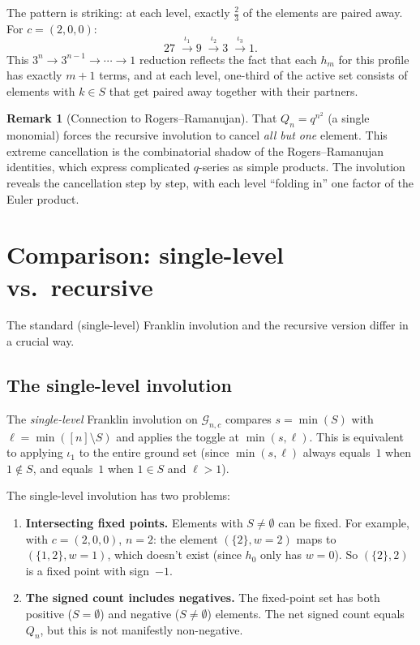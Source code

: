 \documentclass[11pt]{article}
\theoremstyle{plain}
\theoremstyle{definition}
\newtheorem{remark}[theorem]{Remark}
\begin{document}
The pattern is striking: at each level, exactly
$\frac{2}{3}$ of the elements are paired away.  For
$c = (2,0,0)$:
\[
  27 \;\xrightarrow{\;\iota_1\;}
  9 \;\xrightarrow{\;\iota_2\;}
  3 \;\xrightarrow{\;\iota_3\;}
  1.
\]
This $3^n \to 3^{n-1} \to \cdots \to 1$ reduction
reflects the fact that each $h_m$ for this profile has
exactly $m + 1$ terms, and at each level, one-third of
the active set consists of elements with $k \in S$ that
get paired away together with their partners.

\begin{remark}[Connection to Rogers--Ramanujan]
\label{rem:RR}
That $Q_n = q^{n^2}$ (a single monomial) forces the
recursive involution to cancel \emph{all but one}
element.  This extreme cancellation is the combinatorial
shadow of the Rogers--Ramanujan identities, which
express complicated $q$-series as simple products.
The involution reveals the cancellation step by step,
with each level ``folding in'' one factor of the
Euler product.
\end{remark}


\section{Comparison: single-level vs.\ recursive}
\label{sec:single-vs-recursive}

The standard (single-level) Franklin involution and the
recursive version differ in a crucial way.


\subsection{The single-level involution}

The \emph{single-level} Franklin involution on
$\mathcal{G}_{n,c}$ compares $s = \min(S)$ with
$\ell = \min([n] \setminus S)$ and applies the toggle at
$\min(s, \ell)$.  This is equivalent to applying $\iota_1$
to the entire ground set (since $\min(s, \ell)$ always
equals~$1$ when $1 \notin S$, and equals~$1$ when
$1 \in S$ and $\ell > 1$).

The single-level involution has two problems:
\begin{enumerate}
  \item \textbf{Intersecting fixed points.}\;
    Elements with $S \neq \emptyset$ can be fixed.
    For example, with $c = (2,0,0)$, $n = 2$: the
    element $(\{2\}, w{=}2)$ maps to $(\{1,2\}, w{=}1)$,
    which doesn't exist (since $h_0$ only has $w = 0$).
    So $(\{2\}, 2)$ is a fixed point with
    sign~$-1$.

  \item \textbf{The signed count includes negatives.}\;
    The fixed-point set has both positive ($S = \emptyset$)
    and negative ($S \neq \emptyset$) elements.  The net
    signed count equals~$Q_n$, but this is not manifestly
    non-negative.
\end{enumerate}
\end{document}
